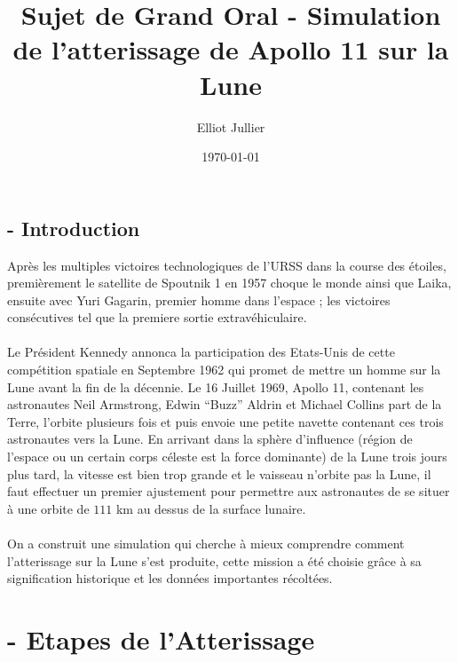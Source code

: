 \documentclass[a4paper, 12pt]{scrartcl}
\begin{document}
\title{Sujet de Grand Oral - Simulation de l'atterissage de Apollo 11 sur la Lune }
\author{Elliot Jullier}
\date{\today}
\maketitle

\tableofcontents

\newpage
{}




\subsection{- Introduction}
Après les multiples victoires technologiques de l'URSS dans la course des étoiles, premièrement le satellite de Spoutnik 1 en 1957 choque le monde ainsi que Laika, ensuite avec Yuri Gagarin, premier homme dans l'espace ; 
les victoires consécutives tel que la premiere sortie extravéhiculaire. 
\\
\\
\indent
Le Président Kennedy annonca la participation des Etats-Unis de cette compétition spatiale en 
Septembre 1962 qui promet de mettre un homme sur la Lune avant la fin de la décennie. 
Le 16 Juillet 1969, Apollo 11, contenant les astronautes Neil Armstrong, Edwin ``Buzz'' Aldrin et Michael Collins
part de la Terre, l'orbite plusieurs fois et puis envoie une petite navette contenant ces trois astronautes vers la Lune.
En arrivant dans la sphère d'influence (région de l'espace ou un certain corps céleste est la force dominante) de la Lune trois jours plus tard, la vitesse est bien trop grande et le vaisseau n'orbite pas la Lune, il faut effectuer un premier ajustement 
pour permettre aux astronautes de se situer à une orbite de $111$ km au dessus de la surface lunaire.
\\
\\
\indent
On a construit une simulation qui cherche à mieux comprendre comment l'atterissage sur la Lune
s'est produite, cette mission a été choisie grâce à sa signification historique et les
données importantes récoltées. 



\section{- Etapes de l'Atterissage}
\end{document}
